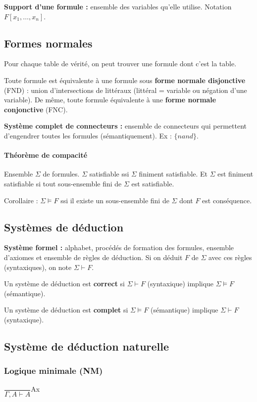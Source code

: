 \documentclass[french]{article}
\begin{document}
\textbf{Support d'une formule :} ensemble des variables qu'elle utilise. Notation $F[x_1, \dots, x_n]$.


\subsection{Formes normales}
Pour chaque table de vérité, on peut trouver une formule dont c'est la table.

Toute formule est équivalente à une formule sous \textbf{forme normale disjonctive} (FND) : union d'intersections de littéraux (littéral = variable ou négation d'une variable). De même, toute formule équivalente à une \textbf{forme normale conjonctive} (FNC).

\textbf{Système complet de connecteurs :} ensemble de connecteurs qui permettent d'engendrer toutes les formules (sémantiquement). Ex : $\{nand\}$.

\paragraph{Théorème de compacité}
Ensemble $\Sigma$ de formules. $\Sigma$ satisfiable ssi $\Sigma$ finiment satisfiable. Et $\Sigma$ est finiment satisfiable si tout sous-ensemble fini de $\Sigma$ est satisfiable.

Corollaire : $\Sigma\models F$ ssi il existe un sous-ensemble fini de $\Sigma$ dont $F$ est conséquence.

\subsection{Systèmes de déduction}
\textbf{Système formel :} alphabet, procédés de formation des formules, ensemble d'axiomes et ensemble de règles de déduction. Si on déduit $F$ de $\Sigma$ avec ces règles (syntaxiques), on note $\Sigma\vdash F$.

Un système de déduction est \textbf{correct} si $\Sigma\vdash F$ (syntaxique) implique $\Sigma\models F$ (sémantique).

Un système de déduction est \textbf{complet} si  $\Sigma\models F$ (sémantique) implique  $\Sigma\vdash F$ (syntaxique).

\subsection{Système de déduction naturelle}
\subsubsection{Logique minimale (NM)}
$\dfrac{}{\Gamma,A\vdash A}$Ax\\
\end{document}
